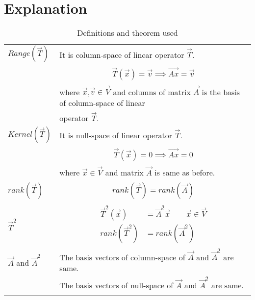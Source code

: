 \documentclass[journal,12pt]{IEEEtran}
\begin{document}
\section{\textbf{Explanation}}
\renewcommand{\thetable}{1}
\begin{longtable}{|l|l|}
\hline
\endhead
$Range(\vec{T})$&It is column-space of linear operator $\vec{T}$.\\&\parbox{15cm}{\begin{align}
    \vec{T}(\vec{x})=\vec{v}
    \implies\vec{Ax}=\vec{v}
\end{align}}\\&where $\vec{x}$,$\vec{v}\in\vec{V}$ and columns of matrix $\vec{A}$ is the basis of column-space of linear\\&operator $\vec{T}$.\\
\hline$Kernel(\vec{T})$&It is null-space of linear operator $\vec{T}$.\\&\parbox{15cm}{\begin{align}
    \vec{T}(\vec{x})=0
    \implies\vec{Ax}=0
\end{align}}\\&where $\vec{x}\in\vec{V}$ and matrix $\vec{A}$ is same as before.\\
\hline$rank(\vec{T})$&\parbox{15cm}{\begin{align}
    rank(\vec{T})=rank(\vec{A})
\end{align}}\\
\hline$\vec{T}^2$&\parbox{15cm}{\begin{align}
    \vec{T}^2(\vec{x})&=\vec{A}^2\vec{x}\quad\quad\vec{x}\in\vec{V}\\
    rank(\vec{T}^2)&=rank(\vec{A}^2)
\end{align}}\\
\hline$\vec{A}$ and $\vec{A}^2$&The basis vectors of column-space of $\vec{A}$ and $\vec{A}^2$ are same.\\&The basis vectors of null-space of $\vec{A}$ and $\vec{A}^2$ are same.\\
\hline
\caption{Definitions and theorem used}
\label{deftab}
\end{longtable}
\newpage
\end{document}
